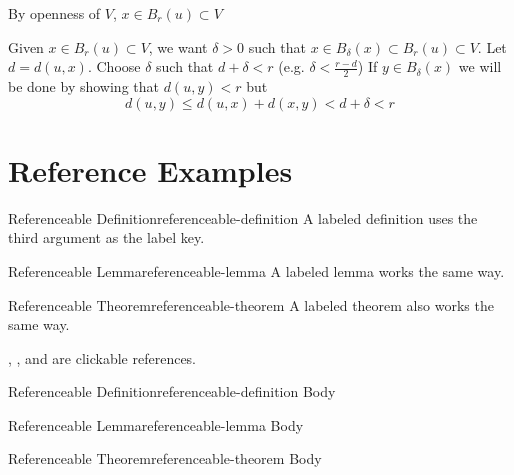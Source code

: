 \documentclass{report}
\begin{document}
\begin{myproof}By openness of $V$, $x\in B_r(u)\subset V$
	\begin{center}
	\end{center}

	Given $x\in B_r(u)\subset V$, we want $\delta>0$ such that $x\in B_{\delta} (x)\subset B_r(u)\subset V$. Let $d=d(u,x)$. Choose $\delta $ such that $d+\delta<r$ (e.g. $\delta<\frac{r-d}{2}$) If $y\in B_{\delta}(x)$ we will be done by showing that $d(u,y)<r$ but $$d(u,y)\leq d(u,x)+d(x,y)<d+\delta<r$$
\end{myproof}

\section{Reference Examples}

\begin{Definition}{Referenceable Definition}{referenceable-definition}
	A labeled definition uses the third argument as the label key.
\end{Definition}

\begin{Lemma}{Referenceable Lemma}{referenceable-lemma}
	A labeled lemma works the same way.
\end{Lemma}

\begin{theorem}{Referenceable Theorem}{referenceable-theorem}
	A labeled theorem also works the same way.
\end{theorem}

, , and
 are clickable references.

\begin{latexcodeblock}[title={Reference Syntax}]
\begin{Definition}{Referenceable Definition}{referenceable-definition}
Body
\end{Definition}

\begin{Lemma}{Referenceable Lemma}{referenceable-lemma}
Body
\end{Lemma}

\begin{theorem}{Referenceable Theorem}{referenceable-theorem}
Body
\end{theorem}

\end{latexcodeblock}
\end{document}
